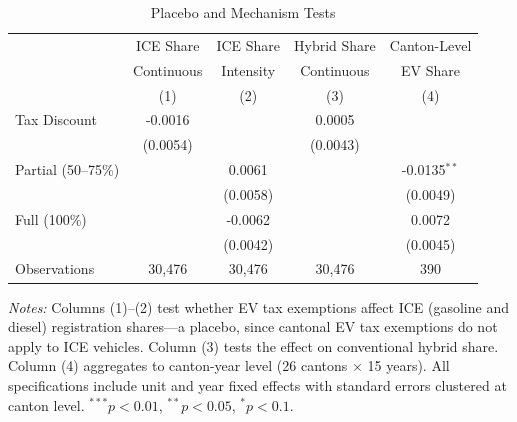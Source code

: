 \begin{table}[htbp]
\centering
\caption{Placebo and Mechanism Tests}
\label{tab:placebo}
\small
\begin{tabular}{lcccc}
\toprule
 & ICE Share & ICE Share & Hybrid Share & Canton-Level \\
 & Continuous & Intensity & Continuous & EV Share \\
 & (1) & (2) & (3) & (4) \\
\midrule
Tax Discount & -0.0016 & & 0.0005 & \\
 & (0.0054) & & (0.0043) & \\
Partial (50--75\%) & & 0.0061 & & -0.0135$^{**}$ \\
 & & (0.0058) & & (0.0049) \\
Full (100\%) & & -0.0062 & & 0.0072 \\
 & & (0.0042) & & (0.0045) \\
\midrule
Observations & 30,476 & 30,476 & 30,476 & 390 \\
\bottomrule
\end{tabular}
\begin{tablenotes}
\item \textit{Notes:} Columns (1)--(2) test whether EV tax exemptions affect ICE (gasoline and diesel) registration shares---a placebo, since cantonal EV tax exemptions do not apply to ICE vehicles. Column (3) tests the effect on conventional hybrid share. Column (4) aggregates to canton-year level (26 cantons $\times$ 15 years). All specifications include unit and year fixed effects with standard errors clustered at canton level. $^{***}p<0.01$, $^{**}p<0.05$, $^{*}p<0.1$.
\end{tablenotes}
\end{table}
